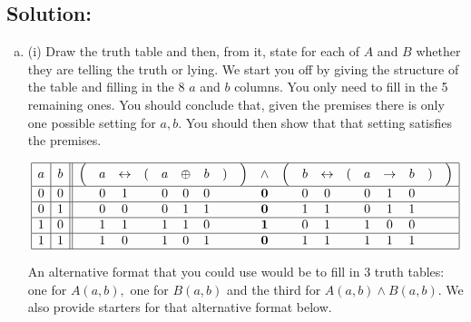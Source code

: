 \documentclass[12pt]{article}
\begin{document}
	\subsection*{\textbf{Solution:}}
	\begin{enumerate}[(a)]
		\item (i) Draw the truth table and then, from it, state for each of $A$ and $B$
			whether they are telling the truth or lying. We start you off by giving
			the structure of the table and filling in the 8 $a$ and $b$ columns. You only
			need to fill in the 5 remaining ones. You should conclude that, given the premises
			there is only one possible setting for $a,b.$ You should then show that that
			setting satisfies the premises.

			\[
				\begin{array}{|c|c||ccccccccccccccccccc|}
					\hline
					a & b & \Bigl( & a & \leftrightarrow & ( & a & \oplus & b & ) & \Bigr) & \wedge  & \Bigl( & b & \leftrightarrow & ( & a & \rightarrow & b & ) & \Bigr) \\
					\hline
					0 & 0 &        & 0 & 1               &   & 0 & 0      & 0 &   &        & {\bf 0} &        & 0 & 0               &   & 0 & 1           & 0 &   &        \\
					\hline
					0 & 1 &        & 0 & 0               &   & 0 & 1      & 1 &   &        & {\bf 0} &        & 1 & 1               &   & 0 & 1           & 1 &   &        \\
					\hline
					1 & 0 &        & 1 & 1               &   & 1 & 1      & 0 &   &        & {\bf 1} &        & 0 & 1               &   & 1 & 0           & 0 &   &        \\
					\hline
					1 & 1 &        & 1 & 0               &   & 1 & 0      & 1 &   &        & {\bf 0} &        & 1 & 1               &   & 1 & 1           & 1 &   &        \\
					\hline
				\end{array}
			\]

			\bigskip

			An alternative format that you could use would be to fill in 3 truth tables:
			one for $A(a,b),$ one for $B(a,b)$ and the third for
			$A(a,b) \wedge B(a,b).$ We also provide starters for that alternative
			format below.


\end{enumerate}
\end{document}
